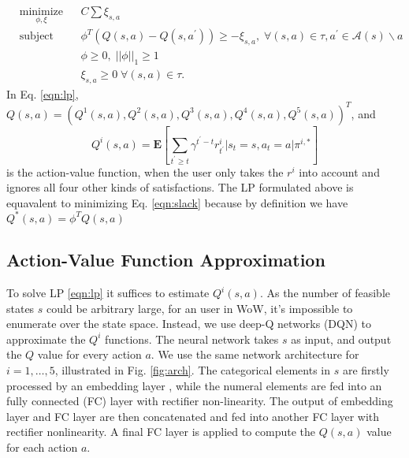 \documentclass{sigchi}
\begin{document}
\begin{equation}
\begin{aligned}
& \underset{\phi, \xi}{\text{minimize}}
& & C\sum \xi_{s,a} \\
& \text{subject to}
& & \phi^T(Q(s,a)-Q(s,a^\prime)) \geq - \xi_{s,a}, \; \forall (s,a) \in \tau, a^\prime \in \mathcal{A}(s)\backslash a \\
&&& \phi \geq 0, \; ||\phi||_1\geq 1\\
&&& \xi_{s,a} \geq 0 \; \forall (s,a) \in \tau. 
\label{eqn:lp}
\end{aligned}
\end{equation}
In Eq. \eqref{eqn:lp}, $Q(s,a)=(Q^1(s,a), Q^2(s,a), Q^3(s,a), Q^4(s,a), Q^5(s,a))^T$, and
\begin{equation}
Q^i(s,a)=\mathbf{E}[\sum_{t^\prime\geq t}\gamma^{t^\prime-t}r^i_{t^\prime} | s_{t}=s, a_{t}=a | \pi^{i,\ast}] \label{eqn:qi}
\end{equation}
is the action-value function, when the user only takes the $r^i$ into account and ignores all four other kinds of satisfactions. The LP formulated above is equavalent to minimizing Eq. \eqref{eqn:slack} because by definition we have $Q^*(s,a)=\phi^TQ(s,a)$

\subsection{Action-Value Function Approximation}

To solve LP \eqref{eqn:lp} it suffices to estimate $Q^i(s,a)$. As the number of feasible states $s$ could be arbitrary large, for an user in WoW, it's impossible to enumerate over the state space. Instead, we use deep-Q networks (DQN) \cite{mnih2015human} to approximate the $Q^i$ functions. The neural network takes $s$ as input, and output the $Q$ value for every action $a$. We use the same network architecture for $i=1,\dots,5$, illustrated in Fig. \ref{fig:arch}. The categorical elements in $s$ are firstly processed by an embedding layer \cite{mikolov2013distributed}, while the numeral elements are fed into an fully connected (FC) layer with rectifier non-linearity. The output of embedding layer and FC layer are then concatenated and fed into another FC layer with rectifier nonlinearity. A final FC layer is applied to compute the $Q(s,a)$ value for each action $a$.
\end{document}
